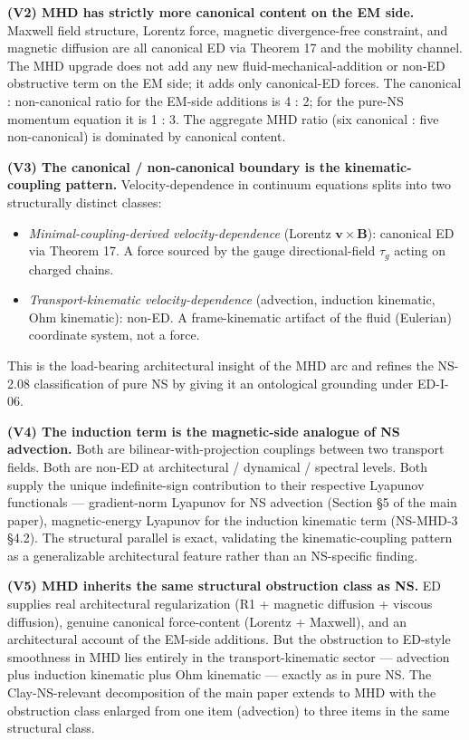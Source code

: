 \documentclass[
  11pt,a4paper]{article}
\providecommand{\tightlist}{%
  \setlength{\itemsep}{0pt}\setlength{\parskip}{0pt}}
\begin{document}
\textbf{(V2) MHD has strictly more canonical content on the EM side.}
Maxwell field structure, Lorentz force, magnetic divergence-free
constraint, and magnetic diffusion are all canonical ED via Theorem 17
and the mobility channel. The MHD upgrade does not add any new
fluid-mechanical-addition or non-ED obstructive term on the EM side; it
adds only canonical-ED forces. The canonical : non-canonical ratio for
the EM-side additions is 4 : 2; for the pure-NS momentum equation it is
1 : 3. The aggregate MHD ratio (six canonical : five non-canonical) is
dominated by canonical content.

\textbf{(V3) The canonical / non-canonical boundary is the
kinematic-coupling pattern.} Velocity-dependence in continuum equations
splits into two structurally distinct classes:

\begin{itemize}
\tightlist
\item
  \emph{Minimal-coupling-derived velocity-dependence} (Lorentz
  \(\mathbf{v}\times\mathbf{B}\)): canonical ED via Theorem 17. A force
  sourced by the gauge directional-field \(\tau_g\) acting on charged
  chains.
\item
  \emph{Transport-kinematic velocity-dependence} (advection, induction
  kinematic, Ohm kinematic): non-ED. A frame-kinematic artifact of the
  fluid (Eulerian) coordinate system, not a force.
\end{itemize}

This is the load-bearing architectural insight of the MHD arc and
refines the NS-2.08 classification of pure NS by giving it an
ontological grounding under ED-I-06.

\textbf{(V4) The induction term is the magnetic-side analogue of NS
advection.} Both are bilinear-with-projection couplings between two
transport fields. Both are non-ED at architectural / dynamical /
spectral levels. Both supply the unique indefinite-sign contribution to
their respective Lyapunov functionals --- gradient-norm Lyapunov for NS
advection (Section §5 of the main paper), magnetic-energy Lyapunov for
the induction kinematic term (NS-MHD-3 §4.2). The structural parallel is
exact, validating the kinematic-coupling pattern as a generalizable
architectural feature rather than an NS-specific finding.

\textbf{(V5) MHD inherits the same structural obstruction class as NS.}
ED supplies real architectural regularization (R1 + magnetic diffusion +
viscous diffusion), genuine canonical force-content (Lorentz + Maxwell),
and an architectural account of the EM-side additions. But the
obstruction to ED-style smoothness in MHD lies entirely in the
transport-kinematic sector --- advection plus induction kinematic plus
Ohm kinematic --- exactly as in pure NS. The Clay-NS-relevant
decomposition of the main paper extends to MHD with the obstruction
class enlarged from one item (advection) to three items in the same
structural class.
\end{document}
